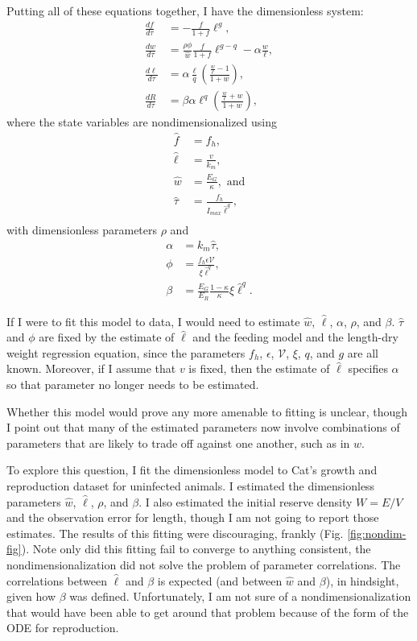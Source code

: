 \documentclass[12pt,reqno,final,pdftex]{amsart}\usepackage[]{graphicx}\usepackage[]{color}
\theoremstyle{plain}
\numberwithin{equation}{part}
\begin{document}
Putting all of these equations together, I have the dimensionless system:
\begin{align}
\frac{df}{d\tau} &= -\frac{f}{1+f}\ell^g, \\
\frac{dw}{d\tau} &= \frac{\rho\phi}{\hat{w}}\frac{f}{1+f}\ell^{g-q}-\alpha\frac{w}{\ell}, \\
\frac{d\ell}{d\tau} &= \alpha \frac{\ell}{q}\left(\frac{\frac{w}{\ell}-1}{1+w}\right), \\
\frac{dR}{d\tau} &= \beta \alpha \ell^q \left(\frac{\frac{w}{\ell}+w}{1+w}\right),
\end{align}
where the state variables are nondimensionalized using
\begin{align}
\hat{f} &= f_h, \\
\hat{\ell} &= \frac{v}{k_m}, \\
\hat{w} &= \frac{E_G}{\kappa}, \text{ and}\\
\hat{\tau} &= \frac{f_h}{I_{max} \hat{\ell}^g}, \\
\end{align}
with dimensionless parameters $\rho$ and
\begin{align}
\alpha &= k_m \hat{\tau}, \\
\phi &= \frac{f_h \epsilon \mathcal{V}}{\xi \hat{\ell}^q}, \\
\beta &= \frac{E_G}{E_R}\frac{1-\kappa}{\kappa}\xi\hat{\ell}^q.
\end{align}

If I were to fit this model to data, I would need to estimate $\hat{w}$, $\hat{\ell}$, $\alpha$, $\rho$, and $\beta$.
$\hat{\tau}$ and $\phi$ are fixed by the estimate of $\hat{\ell}$ and the feeding model and the length-dry weight regression equation, since the parameters $f_h$, $\epsilon$, $\mathcal{V}$, $\xi$, $q$, and $g$ are all known.
Moreover, if I assume that $v$ is fixed, then the estimate of $\hat{\ell}$ specifies $\alpha$ so that parameter no longer needs to be estimated.

Whether this model would prove any more amenable to fitting is unclear, though I point out that many of the estimated parameters now involve combinations of parameters that are likely to trade off against one another, such as in $\hat{w}$.

To explore this question, I fit the dimensionless model to Cat's growth and reproduction dataset for uninfected animals.
I estimated the dimensionless parameters $\hat{w}$, $\hat{\ell}$, $\rho$, and $\beta$.
I also estimated the initial reserve density $W=E/V$ and the observation error for length, though I am not going to report those estimates.
The results of this fitting were discouraging, frankly (Fig. \ref{fig:nondim-fig}).
Note only did this fitting fail to converge to anything consistent, the nondimensionalization did not solve the problem of parameter correlations.
The correlations between $\hat{\ell}$ and $\beta$ is expected (and between $\hat{w}$ and $\beta$), in hindsight, given how $\beta$ was defined.
Unfortunately, I am not sure of a nondimensionalization that would have been able to get around that problem because of the form of the ODE for reproduction.
\end{document}
